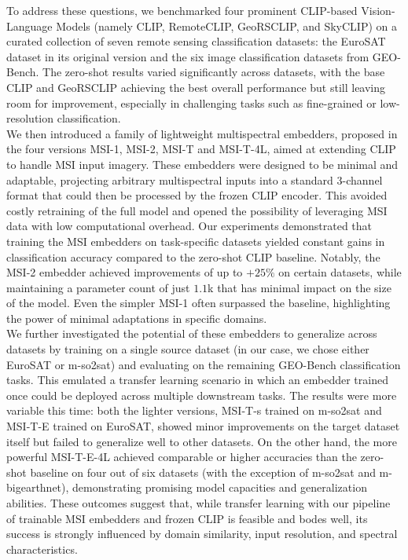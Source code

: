\documentclass[a4paper, twoside, english]{sapthesis} %
\begin{document}
To address these questions, we benchmarked four prominent CLIP-based Vision-Language Models (namely CLIP, RemoteCLIP, GeoRSCLIP, and SkyCLIP) on a curated collection of seven remote sensing classification datasets: the EuroSAT dataset in its original version and the six image classification datasets from GEO-Bench. The zero-shot results varied significantly across datasets, with the base CLIP and GeoRSCLIP achieving the best overall performance but still leaving room for improvement, especially in challenging tasks such as fine-grained or low-resolution classification. \\

We then introduced a family of lightweight multispectral embedders, proposed in the four versions MSI-1, MSI-2, MSI-T and MSI-T-4L, aimed at extending CLIP to handle MSI input imagery. These embedders were designed to be minimal and adaptable, projecting arbitrary multispectral inputs into a standard 3-channel format that could then be processed by the frozen CLIP encoder. This avoided costly retraining of the full model and opened the possibility of leveraging MSI data with low computational overhead.
Our experiments demonstrated that training the MSI embedders on task-specific datasets yielded constant gains in classification accuracy compared to the zero-shot CLIP baseline. Notably, the MSI-2 embedder achieved improvements of up to $+25\%$ on certain datasets, while maintaining a parameter count of just $1.1$k that has minimal impact on the size of the model. Even the simpler MSI-1 often surpassed the baseline, highlighting the power of minimal adaptations in specific domains. \\

We further investigated the potential of these embedders to generalize across datasets by training on a single source dataset (in our case, we chose either EuroSAT or m-so2sat) and evaluating on the remaining GEO-Bench classification tasks. This emulated a transfer learning scenario in which an embedder trained once could be deployed across multiple downstream tasks.
The results were more variable this time: both the lighter versions, MSI-T-s trained on m-so2sat and MSI-T-E trained on EuroSAT, showed minor improvements on the target dataset itself but failed to generalize well to other datasets. On the other hand, the more powerful MSI-T-E-4L achieved comparable or higher accuracies than the zero-shot baseline on four out of six datasets (with the exception of m-so2sat and m-bigearthnet), demonstrating promising model capacities and generalization abilities.
These outcomes suggest that, while transfer learning with our pipeline of trainable MSI embedders and frozen CLIP is feasible and bodes well, its success is strongly influenced by domain similarity, input resolution, and spectral characteristics. \\
\end{document}
